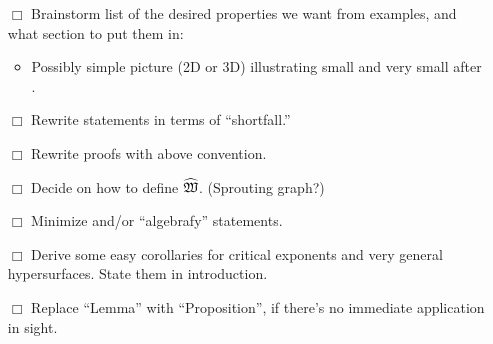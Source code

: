 \documentclass[11pt]{amsart}
\begin{document}
{\begin{enumerate}
\item[$\Box$]  Brainstorm list of the desired properties we want from examples, and what section to put them in: 
\begin{itemize}
   \item Possibly simple picture (2D or 3D) illustrating small and very small after .
\end{itemize}
\item[$\Box$] Rewrite statements in terms of ``shortfall.''
\item[$\Box$] Rewrite proofs with above convention.
 \item[$\Box$] Decide on how to define $\widehat{\mathfrak{W}}$.  (Sprouting graph?)
    \item[$\Box$] Minimize and/or ``algebrafy'' statements.
 \item[$\Box$] Derive some easy corollaries for critical exponents and very general hypersurfaces.  State them in introduction. 

    \item[$\Box$] Replace ``Lemma'' with ``Proposition'', if there's no immediate application in sight.
 

\end{enumerate}}
\end{document}
